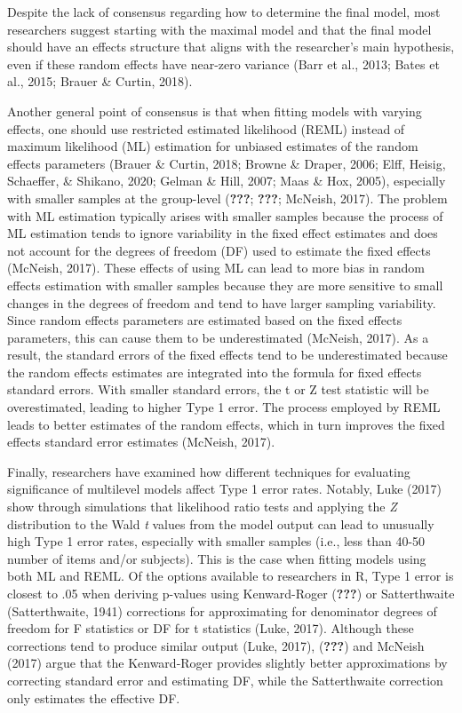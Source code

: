 \documentclass[
  english,
  man]{apa6}
\begin{document}
Despite the lack of consensus regarding how to determine the final model, most researchers suggest starting with the maximal model and that the final model should have an effects structure that aligns with the researcher's main hypothesis, even if these random effects have near-zero variance (Barr et al., 2013; Bates et al., 2015; Brauer \& Curtin, 2018).

Another general point of consensus is that when fitting models with varying effects, one should use restricted estimated likelihood (REML) instead of maximum likelihood (ML) estimation for unbiased estimates of the random effects parameters (Brauer \& Curtin, 2018; Browne \& Draper, 2006; Elff, Heisig, Schaeffer, \& Shikano, 2020; Gelman \& Hill, 2007; Maas \& Hox, 2005), especially with smaller samples at the group-level ({\textbf{???}}; {\textbf{???}}; McNeish, 2017). The problem with ML estimation typically arises with smaller samples because the process of ML estimation tends to ignore variability in the fixed effect estimates and does not account for the degrees of freedom (DF) used to estimate the fixed effects (McNeish, 2017). These effects of using ML can lead to more bias in random effects estimation with smaller samples because they are more sensitive to small changes in the degrees of freedom and tend to have larger sampling variability. Since random effects parameters are estimated based on the fixed effects parameters, this can cause them to be underestimated (McNeish, 2017). As a result, the standard errors of the fixed effects tend to be underestimated because the random effects estimates are integrated into the formula for fixed effects standard errors. With smaller standard errors, the t or Z test statistic will be overestimated, leading to higher Type 1 error. The process employed by REML leads to better estimates of the random effects, which in turn improves the fixed effects standard error estimates (McNeish, 2017).

Finally, researchers have examined how different techniques for evaluating significance of multilevel models affect Type 1 error rates. Notably, Luke (2017) show through simulations that likelihood ratio tests and applying the \emph{Z} distribution to the Wald \emph{t} values from the model output can lead to unusually high Type 1 error rates, especially with smaller samples (i.e., less than 40-50 number of items and/or subjects). This is the case when fitting models using both ML and REML. Of the options available to researchers in R, Type 1 error is closest to .05 when deriving p-values using Kenward-Roger ({\textbf{???}}) or Satterthwaite (Satterthwaite, 1941) corrections for approximating for denominator degrees of freedom for F statistics or DF for t statistics (Luke, 2017). Although these corrections tend to produce similar output (Luke, 2017), ({\textbf{???}}) and McNeish (2017) argue that the Kenward-Roger provides slightly better approximations by correcting standard error and estimating DF, while the Satterthwaite correction only estimates the effective DF.
\end{document}
